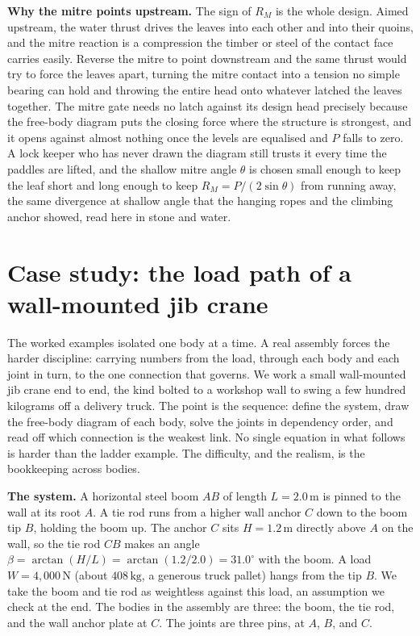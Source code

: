 \textbf{Why the mitre points upstream.} The sign of $R_M$ is the whole design.
Aimed upstream, the water thrust drives the leaves into each other and into
their quoins, and the mitre reaction is a compression the timber or steel of the
contact face carries easily. Reverse the mitre to point downstream and the same
thrust would try to force the leaves apart, turning the mitre contact into a
tension no simple bearing can hold and throwing the entire head onto whatever
latched the leaves together. The mitre gate needs no latch against its design
head precisely because the free-body diagram puts the closing force where the
structure is strongest, and it opens against almost nothing once the levels are
equalised and $P$ falls to zero. A lock keeper who has never drawn the diagram
still trusts it every time the paddles are lifted, and the shallow mitre angle
$\theta$ is chosen small enough to keep the leaf short and long enough to keep
$R_M = P/(2\sin\theta)$ from running away, the same divergence at shallow angle
that the hanging ropes and the climbing anchor showed, read here in stone and
water.

\section{Case study: the load path of a wall-mounted jib crane}

The worked examples isolated one body at a time. A real assembly forces
the harder discipline: carrying numbers from the load, through each body
and each joint in turn, to the one connection that governs. We work a
small wall-mounted jib crane end to end, the kind bolted to a workshop
wall to swing a few hundred kilograms off a delivery truck. The point is
the sequence: define the system, draw the free-body diagram of each body,
solve the joints in dependency order, and read off which connection is the
weakest link. No single equation in what follows is harder than the ladder
example. The difficulty, and the realism, is the bookkeeping across
bodies.



\textbf{The system.} A horizontal steel boom $AB$ of length $L = 2.0\,
\si{\meter}$ is pinned to the wall at its root $A$. A tie rod runs from a
higher wall anchor $C$ down to the boom tip $B$, holding the boom up. The
anchor $C$ sits $H = 1.2\,\si{\meter}$ directly above $A$ on the wall, so
the tie rod $CB$ makes an angle $\beta = \arctan(H/L) = \arctan(1.2/2.0) =
31.0^{\circ}$ with the boom. A load $W = 4{,}000\,\text{N}$ (about $408\,
\si{\kilogram}$, a generous truck pallet) hangs from the tip $B$. We take
the boom and tie rod as weightless against this load, an assumption we
check at the end. The bodies in the assembly are three: the boom, the tie
rod, and the wall anchor plate at $C$. The joints are three pins, at $A$,
$B$, and $C$.

